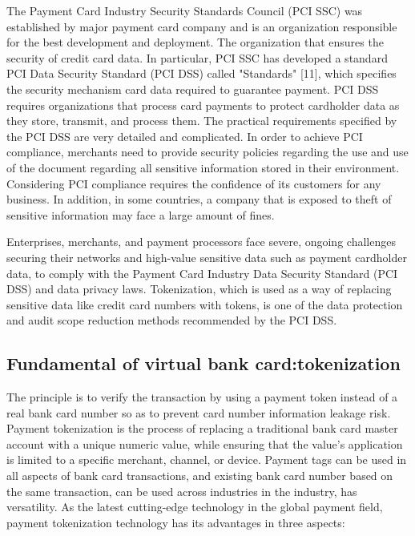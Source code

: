 \documentclass[journal]{IEEEtran}
\begin{document}
The Payment Card Industry Security Standards Council (PCI SSC) was established by major payment card company and is an organization responsible for the best development and deployment. The organization that ensures the security of credit card data. In particular, PCI SSC has developed a standard PCI Data Security Standard (PCI DSS) called "Standards" [11], which specifies the security mechanism card data required to guarantee payment. PCI DSS requires organizations that process card payments to protect cardholder data as they store, transmit, and process them. The practical requirements specified by the PCI DSS are very detailed and complicated. In order to achieve PCI compliance, merchants need to provide security policies regarding the use and use of the document regarding all sensitive information stored in their environment. Considering PCI compliance requires the confidence of its customers for any business. In addition, in some countries, a company that is exposed to theft of sensitive information may face a large amount of fines.

Enterprises, merchants, and payment processors face severe, ongoing challenges securing their networks and high-value sensitive data such as payment cardholder data, to comply with the Payment Card Industry Data Security Standard (PCI DSS) and data privacy laws. Tokenization, which is used as a way of replacing sensitive data like credit card numbers with tokens, is one of the data protection and audit scope reduction methods recommended by the PCI DSS. 



\subsection{Fundamental of virtual bank card:tokenization }


The principle is to verify the transaction by using a payment token instead of a real bank card number so as to prevent card number information leakage risk. Payment tokenization is the process of replacing a traditional bank card master account with a unique numeric value, while ensuring that the value's application is limited to a specific merchant, channel, or device. Payment tags can be used in all aspects of bank card transactions, and existing bank card number based on the same transaction, can be used across industries in the industry, has versatility.
As the latest cutting-edge technology in the global payment field, payment tokenization technology has its advantages in three aspects:
\end{document}
